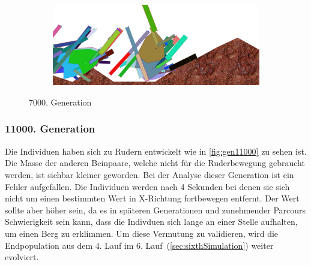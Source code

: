 \begin{figure}[H]
\begin{subfigure}[b]{0.45\textwidth}
                \includegraphics[width=\linewidth,center]{graphics/simulation-results/4_gen7000_4}
                \caption{\label{fig:gen7000_4}}
              \end{subfigure}
              \caption{7000. Generation \label{fig:gen7000}}
            \end{figure}

          \subsubsection{11000. Generation}
            Die Individuen haben sich zu Rudern entwickelt wie in \vref{fig:gen11000} zu sehen ist.
            Die Masse der anderen Beinpaare, welche nicht für die Ruderbewegung gebraucht werden, ist sichbar kleiner geworden.
            Bei der Analyse dieser Generation ist ein Fehler aufgefallen. Die Individuen werden nach 4 Sekunden bei denen sie sich nicht um einen bestimmten Wert in X-Richtung fortbewegen entfernt.
            Der Wert sollte aber höher sein, da es in späteren Generationen und zunehmender Parcours Schwierigkeit sein kann, dass die Indivduen sich lange an einer Stelle aufhalten, um einen Berg zu erklimmen.
            Um diese Vermutung zu validieren, wird die Endpopulation aus dem 4. Lauf im 6. Lauf~(\vref{sec:sixthSimulation}) weiter evolviert.


